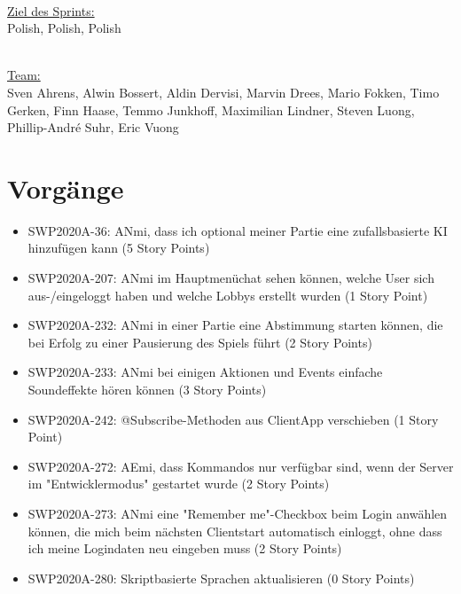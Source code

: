 \documentclass[12pt,a4paper, oneside]{article}
\begin{document}
    \noindent
    \\
    \underline{Ziel des Sprints:}
    \\
    Polish, Polish, Polish

    \noindent
    \\
    \underline {Team:}
    \\
    Sven Ahrens, Alwin Bossert, Aldin Dervisi, Marvin Drees, Mario Fokken,
    Timo Gerken, Finn Haase, Temmo Junkhoff, Maximilian Lindner, Steven Luong, Phillip-André Suhr, Eric Vuong


    \section{Vorgänge}

    \begin{itemize}

        \item SWP2020A-36: ANmi, dass ich optional meiner Partie eine zufallsbasierte KI hinzufügen kann (5 Story Points)

        \item SWP2020A-207: ANmi im Hauptmenüchat sehen können, welche User sich aus-/eingeloggt haben und welche Lobbys erstellt wurden (1 Story Point)

        \item SWP2020A-232: ANmi in einer Partie eine Abstimmung starten können, die bei Erfolg zu einer Pausierung des Spiels führt (2 Story Points)

        \item SWP2020A-233: ANmi bei einigen Aktionen und Events einfache Soundeffekte hören können (3 Story Points)

        \item SWP2020A-242: @Subscribe-Methoden aus ClientApp verschieben (1 Story Point)

        \item SWP2020A-272: AEmi, dass Kommandos nur verfügbar sind, wenn der Server im "Entwicklermodus" gestartet wurde (2 Story Points)

        \item SWP2020A-273: ANmi eine "Remember me"-Checkbox beim Login anwählen können, die mich beim nächsten Clientstart automatisch einloggt, ohne dass ich meine Logindaten neu eingeben muss (2 Story Points)

        \item SWP2020A-280: Skriptbasierte Sprachen aktualisieren (0 Story Points)


\end{itemize}
\end{document}
